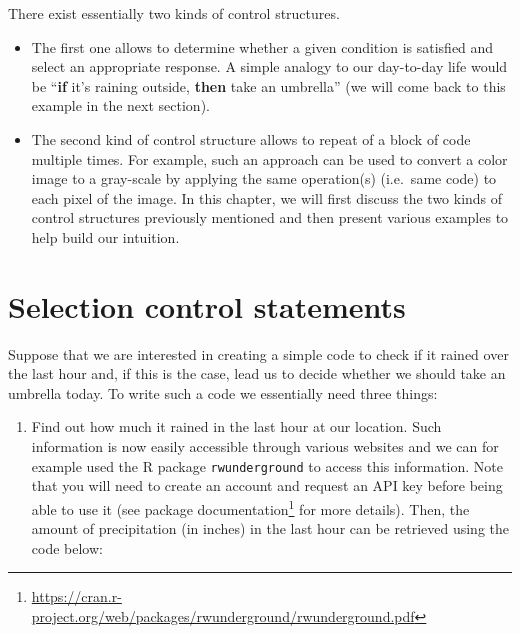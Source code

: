 \documentclass[12pt,]{krantz}
\newenvironment{Shaded}{\begin{snugshade}}{\end{snugshade}}
\newcommand{\KeywordTok}[1]{\textcolor[rgb]{0.27,0.27,0.27}{\textbf{#1}}}
\newcommand{\DataTypeTok}[1]{\textcolor[rgb]{0.27,0.27,0.27}{#1}}
\newcommand{\StringTok}[1]{\textcolor[rgb]{0.5,0.5,0.5}{#1}}
\newcommand{\OtherTok}[1]{\textcolor[rgb]{0.37,0.37,0.37}{#1}}
\newcommand{\OperatorTok}[1]{\textcolor[rgb]{0.43,0.43,0.43}{\textbf{#1}}}
\newcommand{\NormalTok}[1]{#1}
\providecommand{\tightlist}{%
  \setlength{\itemsep}{0pt}\setlength{\parskip}{0pt}}
\renewcommand{\href}[2]{#2\footnote{\url{#1}}}
\begin{document}
There exist essentially two kinds of control structures.

\begin{itemize}
\tightlist
\item
  The first one allows to determine whether a given condition is
  satisfied and select an appropriate response. A simple analogy to our
  day-to-day life would be ``\textbf{if} it's raining outside,
  \textbf{then} take an umbrella'' (we will come back to this example in
  the next section).
\item
  The second kind of control structure allows to repeat of a block of
  code multiple times. For example, such an approach can be used to
  convert a color image to a gray-scale by applying the same
  operation(s) (i.e.~same code) to each pixel of the image. In this
  chapter, we will first discuss the two kinds of control structures
  previously mentioned and then present various examples to help build
  our intuition.
\end{itemize}

\section{Selection control statements}\label{selcontrostat}

Suppose that we are interested in creating a simple code to check if it
rained over the last hour and, if this is the case, lead us to decide
whether we should take an umbrella today. To write such a code we
essentially need three things:

\begin{enumerate}
\def\labelenumi{\arabic{enumi})}
\tightlist
\item
  Find out how much it rained in the last hour at our location. Such
  information is now easily accessible through various websites and we
  can for example used the R package \texttt{rwunderground} to access
  this information. Note that you will need to create an account and
  request an API key before being able to use it (see
  \href{https://cran.r-project.org/web/packages/rwunderground/rwunderground.pdf}{package
  documentation} for more details). Then, the amount of precipitation
  (in inches) in the last hour can be retrieved using the code below:
\end{enumerate}

\begin{Shaded}
\end{Shaded}
\end{document}
